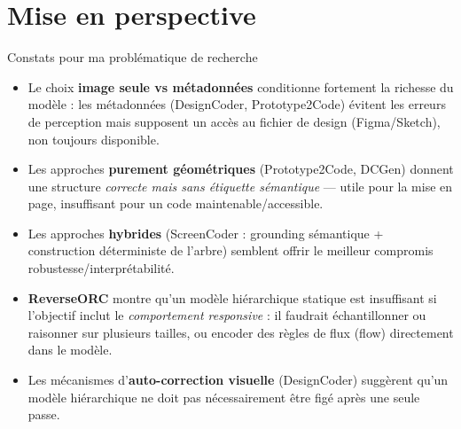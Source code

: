 \documentclass[10pt,aspectratio=169]{beamer}
\begin{document}
\section{Mise en perspective}
\begin{frame}{Constats pour ma problématique de recherche}
\begin{itemize}
  \item Le choix \textbf{image seule vs métadonnées} conditionne fortement la richesse du modèle : les métadonnées (DesignCoder, Prototype2Code) évitent les erreurs de perception mais supposent un accès au fichier de design (Figma/Sketch), non toujours disponible.
  \item Les approches \textbf{purement géométriques} (Prototype2Code, DCGen) donnent une structure \emph{correcte mais sans étiquette sémantique} — utile pour la mise en page, insuffisant pour un code maintenable/accessible.
  \item Les approches \textbf{hybrides} (ScreenCoder : grounding sémantique + construction déterministe de l'arbre) semblent offrir le meilleur compromis robustesse/interprétabilité.
  \item \textbf{ReverseORC} montre qu'un modèle hiérarchique statique est insuffisant si l'objectif inclut le \emph{comportement responsive} : il faudrait échantillonner ou raisonner sur plusieurs tailles, ou encoder des règles de flux (flow) directement dans le modèle.
  \item Les mécanismes d'\textbf{auto-correction visuelle} (DesignCoder) suggèrent qu'un modèle hiérarchique ne doit pas nécessairement être figé après une seule passe.
\end{itemize}
\end{frame}
\end{document}
